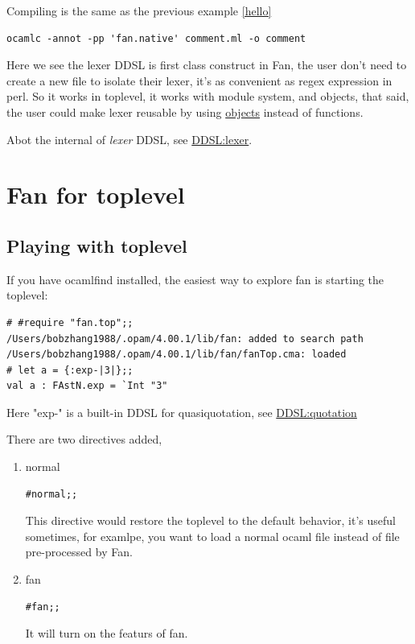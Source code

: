 \documentclass[11pt]{article}
\begin{document}
Compiling is the same as the previous example \ref{hello}

\begin{verbatim}
ocamlc -annot -pp 'fan.native' comment.ml -o comment
\end{verbatim}

Here we see the lexer DDSL is first class construct in Fan, the
user don't need to create a new file to isolate their lexer, it's
as convenient as regex expression in perl. So it works in
toplevel, it works with module system, and objects, that said, the
user could make lexer reusable by using \href{http://caml.inria.fr/pub/docs/manual-ocaml/manual005.html}{objects} instead of
functions.

Abot the internal of \emph{lexer} DDSL, see \href{ddsl/lexer.org}{DDSL:lexer}.
\section{Fan for toplevel}
\label{sec-4}

\subsection{Playing with toplevel}
\label{sec-4-1}

If you have ocamlfind installed, the easiest way to explore fan is
starting the toplevel:

\begin{verbatim}
# #require "fan.top";;
/Users/bobzhang1988/.opam/4.00.1/lib/fan: added to search path
/Users/bobzhang1988/.opam/4.00.1/lib/fan/fanTop.cma: loaded
# let a = {:exp-|3|};;
val a : FAstN.exp = `Int "3"
\end{verbatim}
Here "exp-" is a built-in DDSL for quasiquotation, see \href{ddsl/quotation.org}{DDSL:quotation}

There are two  directives added,

\begin{enumerate}
\item normal
\begin{verbatim}
#normal;;
\end{verbatim}
This directive would restore the toplevel to the default
behavior, it's useful sometimes, for examlpe, you want to load
a normal ocaml file instead of file pre-processed by Fan.
\item fan
\begin{verbatim}
#fan;;
\end{verbatim}
It will turn on the featurs of fan.
\end{enumerate}
\end{document}
